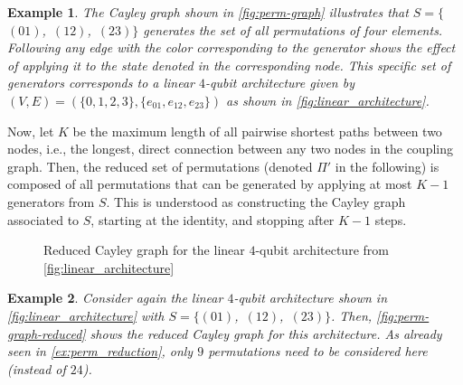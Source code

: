 \documentclass[10pt,conference]{IEEEtran}
\newtheorem{example}{Example}
\begin{document}
 \begin{example}
 	 The Cayley graph shown in \autoref{fig:perm-graph} illustrates that \mbox{$S=\{$\textcolor{Blue01}{$(01)$}, \textcolor{Yellow12}{$(12)$}, \textcolor{Gray23}{$(23)$}$\}$} generates the set of all permutations of four elements. Following any edge with the color corresponding to the generator shows the effect of applying it to the state denoted in the corresponding node. 
 	This specific set of generators corresponds to a linear $4$-qubit architecture given by \mbox{$(V, E) = (\{0,1,2,3\}, \{e_{01},e_{12},e_{23}\})$} as shown in \autoref{fig:linear_architecture}.
 \end{example}
 
Now, let $K$ be the maximum length of all pairwise shortest paths between two nodes, i.e., the longest, direct connection between any two nodes in the coupling graph.
Then, the reduced set of permutations (denoted $\Pi'$ in the following) is composed of all permutations that can be generated by applying at most $K-1$ generators from $S$.
This is understood as constructing the Cayley graph associated to $S$, starting at the identity, and stopping after $K-1$ steps. 
 
 \begin{figure}[t]
\centering
\resizebox{0.85\linewidth}{!}{
\begin{tikzpicture}
	
\end{tikzpicture}} 
  \caption{Reduced Cayley graph for the linear $4$-qubit architecture from \autoref{fig:linear_architecture}}
  \label{fig:perm-graph-reduced}
\end{figure}
 
 \begin{example}
 	Consider again the linear $4$-qubit architecture shown in \autoref{fig:linear_architecture} with \mbox{$S=\{$\textcolor{Blue01}{$(01)$}, \textcolor{Yellow12}{$(12)$}, \textcolor{Gray23}{$(23)$}$\}$}. Then, \autoref{fig:perm-graph-reduced} shows the reduced Cayley graph for this architecture. As already seen in \autoref{ex:perm_reduction}, only $9$ permutations need to be considered here (instead of $24$). 
 \end{example} 
 
\end{document}

